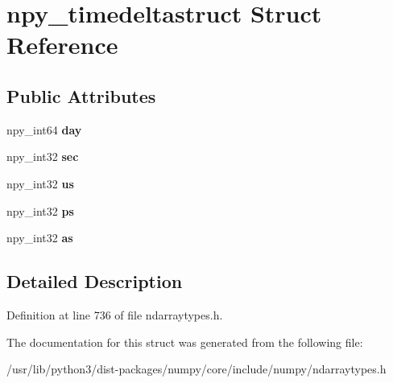 \hypertarget{structnpy__timedeltastruct}{}\section{npy\+\_\+timedeltastruct Struct Reference}
\label{structnpy__timedeltastruct}
\subsection*{Public Attributes}
\begin{DoxyCompactItemize}
\item 
npy\+\_\+int64 {\bfseries day}\hypertarget{structnpy__timedeltastruct_a3a2b7c5b1bcf64ab0cacf5dd9d256899}{}\label{structnpy__timedeltastruct_a3a2b7c5b1bcf64ab0cacf5dd9d256899}

\item 
npy\+\_\+int32 {\bfseries sec}\hypertarget{structnpy__timedeltastruct_a6242f413150d736dccc16155808a32fa}{}\label{structnpy__timedeltastruct_a6242f413150d736dccc16155808a32fa}

\item 
npy\+\_\+int32 {\bfseries us}\hypertarget{structnpy__timedeltastruct_a46be561563734de4d4c9ab188206d8bd}{}\label{structnpy__timedeltastruct_a46be561563734de4d4c9ab188206d8bd}

\item 
npy\+\_\+int32 {\bfseries ps}\hypertarget{structnpy__timedeltastruct_a34ce3cfa60800b41e16251ce55ef655d}{}\label{structnpy__timedeltastruct_a34ce3cfa60800b41e16251ce55ef655d}

\item 
npy\+\_\+int32 {\bfseries as}\hypertarget{structnpy__timedeltastruct_a2de3615778e1ed4ad852cd84a96669a3}{}\label{structnpy__timedeltastruct_a2de3615778e1ed4ad852cd84a96669a3}

\end{DoxyCompactItemize}


\subsection{Detailed Description}


Definition at line 736 of file ndarraytypes.\+h.



The documentation for this struct was generated from the following file\+:\begin{DoxyCompactItemize}
\item 
/usr/lib/python3/dist-\/packages/numpy/core/include/numpy/ndarraytypes.\+h\end{DoxyCompactItemize}

